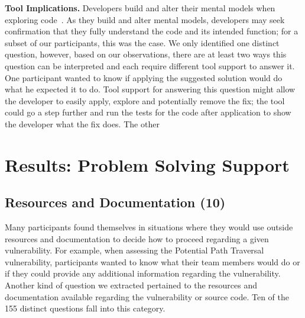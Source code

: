 \documentclass[conference]{IEEEtran}
\begin{document}
\noindent\textbf{Tool Implications.} Developers build and alter their mental models when exploring code~\cite{canas1994mental, burkhardt1997mental}. 
As they build and alter mental models, developers may seek confirmation that they fully understand the code and its intended function; for a subset of our participants, this was the case. 
We only identified one distinct question, however, based on our observations, there are at least two ways this question can be interpreted and each require different tool support to answer it.
One participant wanted to know if applying the suggested solution would do what he expected it to do. 
Tool support for answering this question might allow the developer to easily apply, explore and potentially remove the fix; the tool could go a step further and run the tests for the code after application to show the developer what the fix does.
The other 



\section{Results: Problem Solving Support}
\label{sec:results-pss}



\noindent\subsection{\textbf{Resources and Documentation (10)}}\label{rd}

Many participants found themselves in situations where they would use outside resources and documentation to decide how to proceed regarding a given vulnerability.
For example, when assessing the Potential Path Traversal vulnerability, participants wanted to know what their team members would do or if they could provide any additional information regarding the vulnerability. 
Another kind of question we extracted pertained to the resources and documentation available regarding the vulnerability or source code. 
Ten of the 155 distinct questions fall into this category. 
\\
\end{document}
